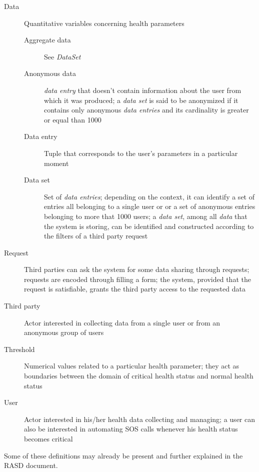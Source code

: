 \documentclass[../DD0.tex]{subfiles}
\begin{document}
    \begin{description}
      \item[Data] Quantitative variables concerning health parameters
      \begin{description}
        \item[Aggregate data] See \textit{DataSet}

        \item[Anonymous data] \textit{data entry} that doesn't contain information about the user from which it was produced; a \textit{data set} is said to be anonymized if it contains only anonymous \textit{data entries} and its cardinality is greater or equal than 1000

        \item[Data entry] Tuple that corresponds to the user's parameters in a particular moment

        \item[Data set] Set of \textit{data entries}; depending on the context, it can identify a set of entries all belonging to a single user or or a set of anonymous entries belonging to more that 1000 users; a \textit{data set}, among all \textit{data} that the system is storing, can be identified and constructed according to the filters of a third party request
      \end{description}
      \item[Request] Third parties can ask the system for some data sharing through requests; requests are encoded through filling a form; the system, provided that the request is satisfiable, grants the third party access to the requested data

      \item[Third party] Actor interested in collecting data from a single user or from an anonymous group of users

      \item[Threshold] Numerical values related to a particular health parameter; they act as boundaries between the domain of critical health status and normal health status

      \item[User] Actor interested in his/her health data collecting and managing; a user can also be interested in automating SOS calls whenever his health status becomes critical
    \end{description}

    Some of these definitions may already be present and further explained in the RASD document.
\end{document}
